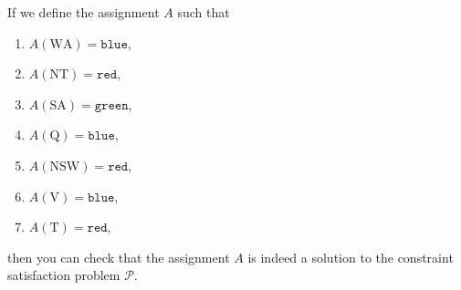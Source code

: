 If we define the assignment $A$ such that
\begin{enumerate}
\item $A(\mathrm{WA}) = \mathtt{blue}$,
\item $A(\mathrm{NT}) = \mathtt{red}$,
\item $A(\mathrm{SA}) = \mathtt{green}$,
\item $A(\mathrm{Q}) = \mathtt{blue}$,
\item $A(\mathrm{NSW}) = \mathtt{red}$,
\item $A(\mathrm{V}) = \mathtt{blue}$,
\item $A(\mathrm{T}) = \mathtt{red}$,
\end{enumerate}
then you can check that the assignment $A$ is indeed a solution to the constraint satisfaction problem $\mathcal{P}$.


